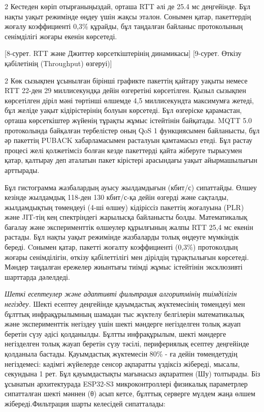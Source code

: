 \begin{multicols}{2}
Кестеден көріп отырғаныңыздай, орташа RTT әлі де 25.4 мс деңгейінде. Бұл
нақты уақыт режимінде өңдеу үшін жақсы эталон. Сонымен қатар,
пакеттердің жоғалу коэффициенті 0,3\% құрайды, бұл таңдалған байланыс
протоколының сенімділігі жоғары екенін көрсетеді.
\end{multicols}

[8-сурет. RTT және Джиттер көрсеткіштерінің динамикасы]
\vspace{-0.5cm}
[9-сурет. Өткізу қабілетінің (Throughput) өзгеруі)]

\begin{multicols}{2}
Көк сызықпен ұсынылған бірінші графикте пакеттің қайтару уақыты немесе
RTT 22-ден 29 миллисекундқа дейін өзгеретіні көрсетілген. Қызыл сызықпен
көрсетілген діріл мәні төртінші өлшемде 4,5 миллисекундта максимумға
жетеді, бұл желіде уақыт кідірістерінің болуын көрсетеді. Бұл өзгеріске
қарамастан, орташа көрсеткіштер жүйенің тұрақты жұмыс істейтінін
байқатады. MQTT 5.0 протоколында байқалған тербелістер оның QoS 1
функциясымен байланысты, бұл әр пакеттің PUBACK хабарламасымен расталуын
қамтамасыз етеді. Бұл растау процесі желі қолжетімсіз болған кезде
пакеттерді қайта жіберуге тырысумен қатар, қалтырау деп аталатын пакет
кірістері арасындағы уақыт айырмашылығын арттырады.

Бұл гистограмма жазбалардың ауысу жылдамдығын (кбит/с) сипаттайды. Өлшеу
кезінде жылдамдық 118-ден 130 кбит/с-қа дейін өзгерді және сақталды,
жылдамдықтың төмендеуі (4-ші өлшеу) кідіріссіз пакеттің жоғалуына (PLR)
және JIT-тің кең спектріндегі жарылысқа байланысты болды. Математикалық
бағалау және эксперименттік өлшеулер құрылғының жалпы RTT 25,4 мс екенін
растады. Бұл нақты уақыт режимінде жазбаларды толық өңдеуге мүмкіндік
береді. Cонымен қатар, пакетті жоғалту коэффициенті (0,3\%) протоколдың
жоғары сенімділігін, өткізу қабілеттілігі мен дірілдің тұрақтылығын
көрсетеді. Мәндер таңдалған ережелер жиынтығы тиімді жұмыс істейтінін
эксклюзивті шарттарда дәлелдеді.

\emph{Шеткі есептеулер және адаптивті фильтрация алгоритмінің
тиімділігін негіздеу.} Шекті есептеу деңгейінде қауымдастық жүктемесінің
төмендеуі мен бұлттық инфрақұрылымның шамадан тыс жүктелу белгілерін
математикалық және эксперименттік негіздеу үшін шекті мәндерге
негізделген толық жауап беретін сүзу әдісі қолданылды. Бұлтты
инфрақұрылым, шекті мәндерге негізделген толық жауап беретін сүзу
тәсілі, перифериялық есептеу деңгейінде қолданыла бастады. Қауымдастық
жүктемесін 80\% - ға дейін төмендетудің негіздемесі: кәдімгі жүйелерде
сенсор ақпаратты үздіксіз жібереді, мысалы, секундына 1 рет. Бұл
қауымдастықты мағынасыз ақпаратпен (Шу) толтырады. Біз ұсынатын
архитектурада ESP32-S3 микроконтроллері физикалық параметрлер
сипатталған шекті мәннен (θ) асып кетсе, бұлттық серверге мүлдем жаңа
өлшем жібереді.Фильтрация шарты келесідей сипатталады:


\end{multicols}
